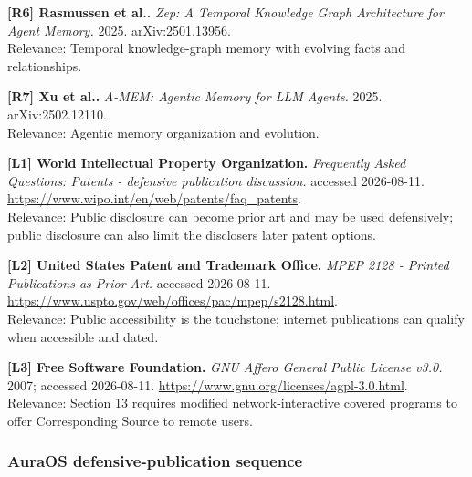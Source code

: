 \documentclass[
  10pt,
  letterpaper,
]{article}
\begin{document}
\textbf{{[}R6{]} Rasmussen et al..} \emph{Zep: A Temporal Knowledge
Graph Architecture for Agent Memory.} 2025. arXiv:2501.13956.\\
Relevance: Temporal knowledge-graph memory with evolving facts and
relationships.

\textbf{{[}R7{]} Xu et al..} \emph{A-MEM: Agentic Memory for LLM
Agents.} 2025. arXiv:2502.12110.\\
Relevance: Agentic memory organization and evolution.

\textbf{{[}L1{]} World Intellectual Property Organization.}
\emph{Frequently Asked Questions: Patents - defensive publication
discussion.} accessed 2026-08-11.
\url{https://www.wipo.int/en/web/patents/faq_patents}.\\
Relevance: Public disclosure can become prior art and may be used
defensively; public disclosure can also limit the
discloser\textquotesingle s later patent options.

\textbf{{[}L2{]} United States Patent and Trademark Office.} \emph{MPEP
2128 - Printed Publications as Prior Art.} accessed 2026-08-11.
\url{https://www.uspto.gov/web/offices/pac/mpep/s2128.html}.\\
Relevance: Public accessibility is the touchstone; internet publications
can qualify when accessible and dated.

\textbf{{[}L3{]} Free Software Foundation.} \emph{GNU Affero General
Public License v3.0.} 2007; accessed 2026-08-11.
\url{https://www.gnu.org/licenses/agpl-3.0.html}.\\
Relevance: Section 13 requires modified network-interactive covered
programs to offer Corresponding Source to remote users.

\subsubsection{AuraOS defensive-publication
sequence}\label{auraos-defensive-publication-sequence}
\end{document}
